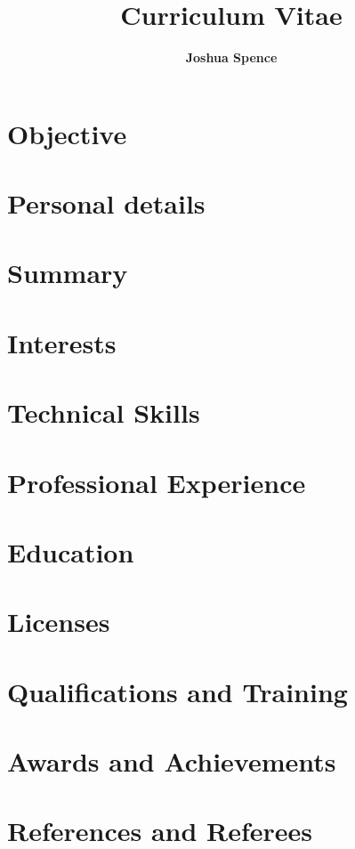 \documentclass{article}
\title{\Huge{\textbf{Curriculum Vitae}}}
\author{\Large{\textbf{Joshua Spence}}}
\date{}
\begin{document}
\maketitle

\section*{Objective}


\section*{Personal details}


\section*{Summary}


\section*{Interests}


\section*{Technical Skills}


\section*{Professional Experience}


\section*{Education}


\section*{Licenses}


\section*{Qualifications and Training}


\section*{Awards and Achievements}


\section*{References and Referees}

\end{document}
